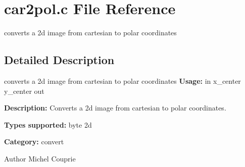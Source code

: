 \section{car2pol.c File Reference}
\label{car2pol_8c}


converts a 2d image from cartesian to polar coordinates  




\subsection{Detailed Description}
converts a 2d image from cartesian to polar coordinates {\bfseries Usage:} in x\_\-center y\_\-center out

{\bfseries Description:} Converts a 2d image from cartesian to polar coordinates.

{\bfseries Types supported:} byte 2d

{\bfseries Category:} convert

\begin{DoxyAuthor}{Author}
Michel Couprie 
\end{DoxyAuthor}
